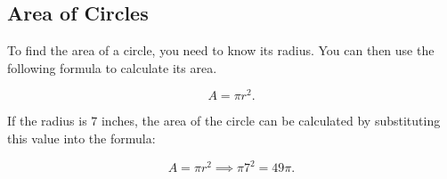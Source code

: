 
\subsection{Area of Circles}
\label{sub_sec:area_of_circles}

To find the area of a circle, you need to know its radius. You can then use the following formula to calculate its area.

\[ A = \pi r^{2} . \]

\begin{example}
	\label{exm:area_of_a_circle}

	If the radius is $7$ inches, the area of the circle can be calculated by
	substituting this value into the formula:

	\[ A = \pi r^{2} \implies \pi 7^{2} = 49\pi . \]
\end{example}




\newpage
